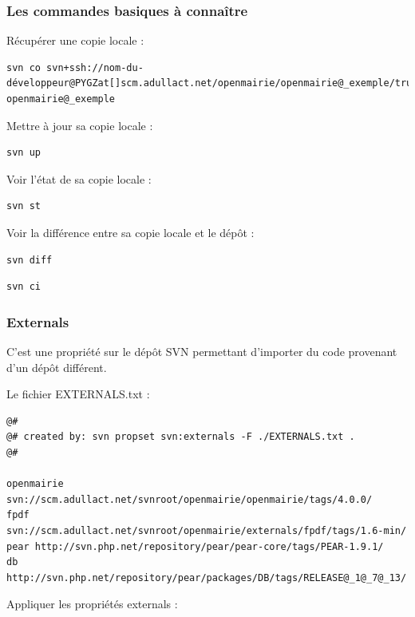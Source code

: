 \documentclass[letterpaper,10pt,french]{manual}
\begin{document}
\subsubsection{Les commandes basiques à connaître}

Récupérer une copie locale :

\begin{Verbatim}[commandchars=@\[\]]
svn co svn+ssh://nom-du-développeur@PYGZat[]scm.adullact.net/openmairie/openmairie@_exemple/trunk openmairie@_exemple
\end{Verbatim}

Mettre à jour sa copie locale :

\begin{Verbatim}[commandchars=@\[\]]
svn up
\end{Verbatim}

Voir l'état de sa copie locale :

\begin{Verbatim}[commandchars=@\[\]]
svn st
\end{Verbatim}

Voir la différence entre sa copie locale et le dépôt :

\begin{Verbatim}[commandchars=@\[\]]
svn diff
\end{Verbatim}

\begin{Verbatim}[commandchars=@\[\]]
svn ci
\end{Verbatim}


\subsubsection{Externals}

C'est une propriété sur le dépôt SVN permettant d'importer du code provenant
d'un dépôt différent.

Le fichier EXTERNALS.txt :

\begin{Verbatim}[commandchars=@\[\]]
@#
@# created by: svn propset svn:externals -F ./EXTERNALS.txt .
@#

openmairie svn://scm.adullact.net/svnroot/openmairie/openmairie/tags/4.0.0/
fpdf svn://scm.adullact.net/svnroot/openmairie/externals/fpdf/tags/1.6-min/
pear http://svn.php.net/repository/pear/pear-core/tags/PEAR-1.9.1/
db http://svn.php.net/repository/pear/packages/DB/tags/RELEASE@_1@_7@_13/
\end{Verbatim}

Appliquer les propriétés externals :
\end{document}
